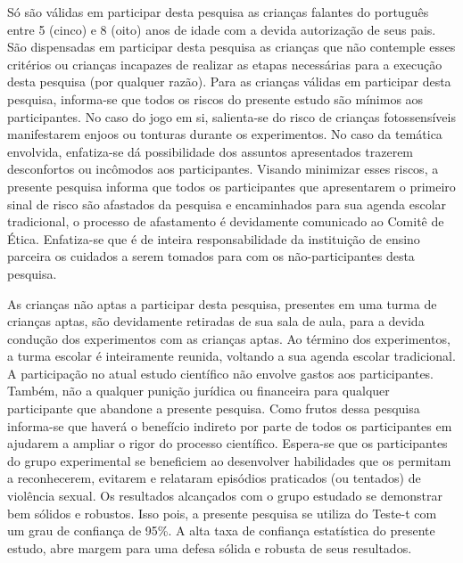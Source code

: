Só são válidas em participar desta pesquisa as crianças falantes do português entre 5 (cinco) e 8 (oito) anos de idade com a devida autorização de seus pais. São dispensadas em participar desta pesquisa as crianças que não contemple esses critérios ou crianças incapazes de realizar as etapas necessárias para a execução desta pesquisa (por qualquer razão). Para as crianças válidas em participar desta pesquisa, informa-se que todos os riscos do presente estudo são mínimos aos participantes. No caso do jogo em si, salienta-se do risco de crianças fotossensíveis manifestarem enjoos ou tonturas durante os experimentos. No caso da temática envolvida, enfatiza-se dá possibilidade dos assuntos apresentados trazerem desconfortos ou incômodos aos participantes. Visando minimizar esses riscos, a presente pesquisa informa que todos os participantes que apresentarem o primeiro sinal de risco são afastados da pesquisa e encaminhados para sua agenda escolar tradicional, o processo de afastamento é devidamente comunicado ao Comitê de Ética. Enfatiza-se que é de inteira responsabilidade da instituição de ensino parceira os cuidados a serem tomados para com os não-participantes desta pesquisa. 


As crianças não aptas a participar desta pesquisa, presentes em uma turma de crianças aptas, são devidamente retiradas de sua sala de aula, para a devida condução dos experimentos com as crianças aptas. Ao término dos experimentos, a turma escolar é inteiramente reunida, voltando a sua agenda escolar tradicional. A participação no atual estudo científico não envolve gastos aos participantes. Também, não a qualquer punição jurídica ou financeira para qualquer participante que abandone a presente pesquisa. Como frutos dessa pesquisa informa-se que haverá o benefício indireto por parte de todos os participantes em ajudarem a ampliar o rigor do processo científico. Espera-se que os participantes do grupo experimental se beneficiem ao desenvolver habilidades que os permitam a reconhecerem, evitarem e relataram episódios praticados (ou tentados) de violência sexual. Os resultados alcançados com o grupo estudado se demonstrar bem sólidos e robustos. Isso pois, a presente pesquisa se utiliza do Teste-t com um grau de confiança de 95\%. A alta taxa de confiança estatística do presente estudo, abre margem para uma defesa sólida e robusta de seus resultados. 

